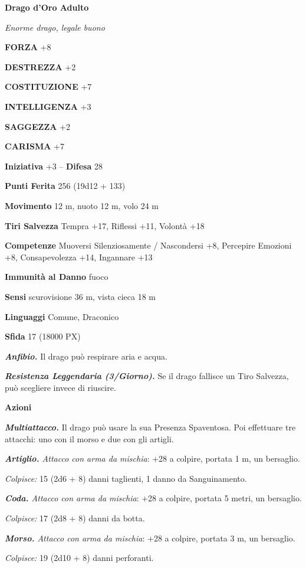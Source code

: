 \begin{multicols}{2}
\medskip{}\textbf{Drago d'Oro Adulto}

\textit{Enorme drago, legale buono}

\textbf{FORZA} +8

\textbf{DESTREZZA} +2

\textbf{COSTITUZIONE} +7

\textbf{INTELLIGENZA} +3

\textbf{SAGGEZZA} +2

\textbf{CARISMA} +7

\textbf{Iniziativa} +3 -- \textbf{Difesa} 28

\textbf{Punti Ferita} 256 (19d12 + 133)

\textbf{Movimento} 12 m, nuoto 12 m, volo 24 m

\textbf{Tiri Salvezza} Tempra +17, Riflessi +11, Volontà +18

\textbf{Competenze} Muoversi Silenziosamente / Nascondersi +8, Percepire Emozioni +8, Consapevolezza +14, Ingannare +13

\textbf{Immunità al Danno} fuoco

\textbf{Sensi} scurovisione 36 m, vista cieca 18 m

\textbf{Linguaggi} Comune, Draconico

\textbf{Sfida} 17 (18000 PX)

\textit{\textbf{Anfibio.}} Il drago può respirare aria e acqua.

\textit{\textbf{Resistenza Leggendaria (3/Giorno).}} Se il drago fallisce un Tiro Salvezza, può scegliere invece di riuscire.

\textbf{Azioni}

\textit{\textbf{Multiattacco.}} Il drago può usare la sua Presenza Spaventosa. Poi effettuare tre attacchi: uno con il morso e due con gli artigli.

\textit{\textbf{Artiglio.} Attacco con arma da mischia}: +28 a colpire, portata 1 m, un bersaglio.

\textit{Colpisce:} 15 (2d6 + 8) danni taglienti, 1 danno da Sanguinamento.

\textit{\textbf{Coda.} Attacco con arma da mischia}: +28 a colpire, portata 5 metri, un bersaglio.

\textit{Colpisce:} 17 (2d8 + 8) danni da botta.

\textit{\textbf{Morso.} Attacco con arma da mischia}: +28 a colpire, portata 3 m, un bersaglio.

\textit{Colpisce:} 19 (2d10 + 8) danni perforanti.


\end{multicols}
